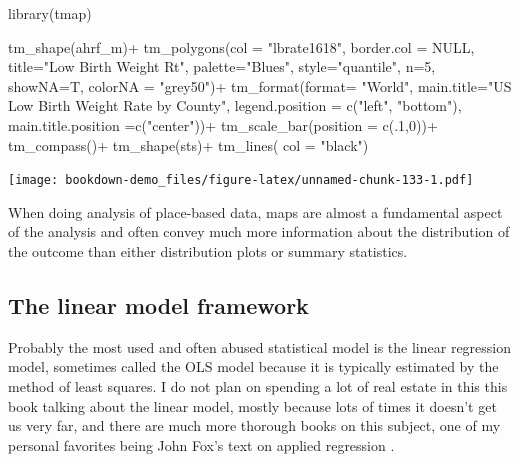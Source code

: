 \documentclass[
]{article}
\newenvironment{Shaded}{\begin{snugshade}}{\end{snugshade}}
\newcommand{\AttributeTok}[1]{\textcolor[rgb]{0.77,0.63,0.00}{#1}}
\newcommand{\ConstantTok}[1]{\textcolor[rgb]{0.00,0.00,0.00}{#1}}
\newcommand{\DecValTok}[1]{\textcolor[rgb]{0.00,0.00,0.81}{#1}}
\newcommand{\FunctionTok}[1]{\textcolor[rgb]{0.00,0.00,0.00}{#1}}
\newcommand{\NormalTok}[1]{#1}
\newcommand{\SpecialCharTok}[1]{\textcolor[rgb]{0.00,0.00,0.00}{#1}}
\newcommand{\StringTok}[1]{\textcolor[rgb]{0.31,0.60,0.02}{#1}}
\begin{document}
\begin{Shaded}
\begin{Highlighting}[]
\FunctionTok{library}\NormalTok{(tmap)}

\FunctionTok{tm\_shape}\NormalTok{(ahrf\_m)}\SpecialCharTok{+}
  \FunctionTok{tm\_polygons}\NormalTok{(}\AttributeTok{col =} \StringTok{"lbrate1618"}\NormalTok{,}
              \AttributeTok{border.col =} \ConstantTok{NULL}\NormalTok{,}
              \AttributeTok{title=}\StringTok{"Low Birth Weight Rt"}\NormalTok{,}
              \AttributeTok{palette=}\StringTok{"Blues"}\NormalTok{,}
              \AttributeTok{style=}\StringTok{"quantile"}\NormalTok{,}
              \AttributeTok{n=}\DecValTok{5}\NormalTok{,}
              \AttributeTok{showNA=}\NormalTok{T, }\AttributeTok{colorNA =} \StringTok{"grey50"}\NormalTok{)}\SpecialCharTok{+}
   \FunctionTok{tm\_format}\NormalTok{(}\AttributeTok{format=} \StringTok{"World"}\NormalTok{,}
             \AttributeTok{main.title=}\StringTok{"US Low Birth Weight Rate by County"}\NormalTok{,}
            \AttributeTok{legend.position =}  \FunctionTok{c}\NormalTok{(}\StringTok{"left"}\NormalTok{, }\StringTok{"bottom"}\NormalTok{),}
            \AttributeTok{main.title.position =}\FunctionTok{c}\NormalTok{(}\StringTok{"center"}\NormalTok{))}\SpecialCharTok{+}
  \FunctionTok{tm\_scale\_bar}\NormalTok{(}\AttributeTok{position =} \FunctionTok{c}\NormalTok{(.}\DecValTok{1}\NormalTok{,}\DecValTok{0}\NormalTok{))}\SpecialCharTok{+}
  \FunctionTok{tm\_compass}\NormalTok{()}\SpecialCharTok{+}
\FunctionTok{tm\_shape}\NormalTok{(sts)}\SpecialCharTok{+}
  \FunctionTok{tm\_lines}\NormalTok{( }\AttributeTok{col =} \StringTok{"black"}\NormalTok{)}
\end{Highlighting}
\end{Shaded}

\texttt{[image: bookdown-demo\_files/figure-latex/unnamed-chunk-133-1.pdf]}

When doing analysis of place-based data, maps are almost a fundamental aspect of the analysis and often convey much more information about the distribution of the outcome than either distribution plots or summary statistics.

\hypertarget{the-linear-model-framework}{%
\subsection{The linear model framework}\label{the-linear-model-framework}}

Probably the most used and often abused statistical model is the linear regression model, sometimes called the OLS model because it is typically estimated by the method of least squares. I do not plan on spending a lot of real estate in this this book talking about the linear model, mostly because lots of times it doesn't get us very far, and there are much more thorough books on this subject, one of my personal favorites being John Fox's text on applied regression \citep{fox_applied_2016}.
\end{document}
